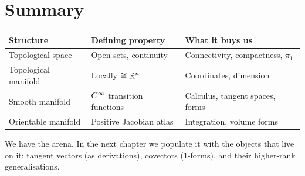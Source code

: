 \section{Summary}

\begin{table}[h]
\centering
\renewcommand{\arraystretch}{1.4}
\begin{tabular}{lll}
\toprule
\textbf{Structure} & \textbf{Defining property} & \textbf{What it buys us} \\
\midrule
Topological space & Open sets, continuity & Connectivity, compactness, $\pi_1$ \\
Topological manifold & Locally $\cong \mathbb{R}^n$ & Coordinates, dimension \\
Smooth manifold & $C^{\infty}$ transition functions & Calculus, tangent spaces, forms \\
Orientable manifold & Positive Jacobian atlas & Integration, volume forms \\
\bottomrule
\end{tabular}
\end{table}

We have the arena. In the next chapter we populate it with the objects that live on it: tangent vectors (as derivations), covectors (1-forms), and their higher-rank generalisations.
